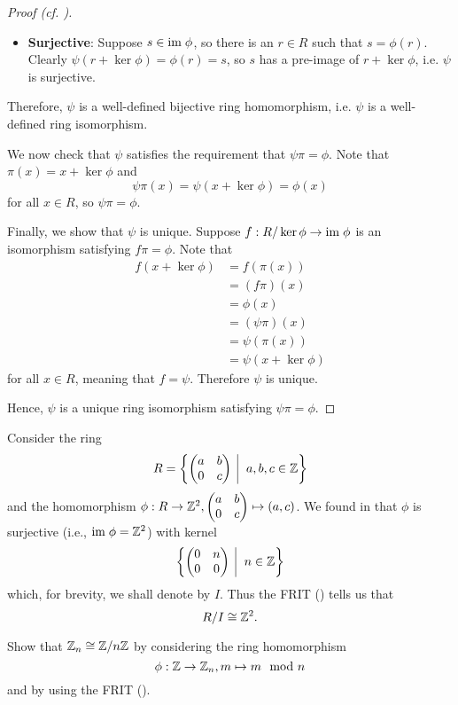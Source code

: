 \begin{proof}[Proof (cf. {\cite[p.~302, Factor Theorem For Rings]{cohn_1982}})]
\begin{itemize}
        \item \textbf{Surjective}: Suppose $s \in \mathrm{im}\;\phi$, so there is an $r \in R$ such that $s = \phi(r)$. Clearly $\psi(r + \ker\phi) = \phi(r) = s$, so $s$ has a pre-image of $r + \ker\phi$, i.e. $\psi$ is surjective.
    \end{itemize}
    Therefore, $\psi$ is a well-defined bijective ring homomorphism, i.e. $\psi$ is a well-defined ring isomorphism.

    We now check that $\psi$ satisfies the requirement that $\psi\pi = \phi$. Note that $\pi(x) = x + \ker\phi$ and
    \[
        \psi\pi(x) = \psi(x + \ker\phi) = \phi(x)
    \]
    for all $x \in R$, so $\psi\pi = \phi$.

    Finally, we show that $\psi$ is unique. Suppose $f: R/\ker\phi \to \mathrm{im}\;\phi$ is an isomorphism satisfying $f\pi=\phi$. Note that
    \begin{align*}
        f(x + \ker\phi) &= f(\pi(x))\\
        &= (f\pi)(x)\\
        &= \phi(x)\\
        &= (\psi\pi)(x)\\
        &= \psi(\pi(x))\\
        &= \psi(x + \ker\phi)
    \end{align*}
    for all $x \in R$, meaning that $f = \psi$. Therefore $\psi$ is unique.

    Hence, $\psi$ is a unique ring isomorphism satisfying $\psi\pi = \phi$.
\end{proof}

\begin{example}
    Consider the ring
    \[
        R = \left\{\begin{pmatrix}a&b\\0&c\end{pmatrix}\vert a,b,c\in\Z\right\}
    \]
    and the homomorphism $\phi: R \to \mathbb{Z}^2, \begin{pmatrix}a&b\\0&c\end{pmatrix} \mapsto (a,c)$. We found in  that $\phi$ is surjective (i.e., $\mathrm{im}\;\phi = \mathbb{Z}^2$) with kernel
    \[
        \left\{\begin{pmatrix}0&n\\0&0\end{pmatrix} \vert n \in \Z\right\}
    \]
    which, for brevity, we shall denote by $I$. Thus the FRIT () tells us that
    \[
        R/I \cong \mathbb{Z}^2.
    \]
\end{example}
\begin{exercise}
    Show that $\mathbb{Z}_n \cong \mathbb{Z}/n\mathbb{Z}$ by considering the ring homomorphism
    \[
        \phi: \mathbb{Z} \to \mathbb{Z}_n, m \mapsto m \mod n
    \]
    and by using the FRIT ().
\end{exercise}

